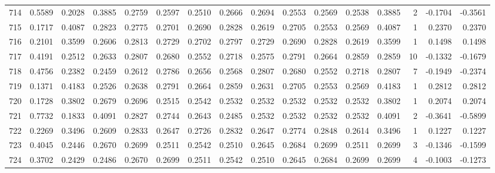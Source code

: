 \begin{tabular}{lrrrrrrrrrrrrrrr}
714 &      0.5589 &  0.2028 &  0.3885 &  0.2759 &  0.2597 &  0.2510 &  0.2666 &  0.2694 &  0.2553 &  0.2569 &   0.2538 &     0.3885 &      2 &                   -0.1704 &                    -0.3561 \\
715 &      0.1717 &  0.4087 &  0.2823 &  0.2775 &  0.2701 &  0.2690 &  0.2828 &  0.2619 &  0.2705 &  0.2553 &   0.2569 &     0.4087 &      1 &                    0.2370 &                     0.2370 \\
716 &      0.2101 &  0.3599 &  0.2606 &  0.2813 &  0.2729 &  0.2702 &  0.2797 &  0.2729 &  0.2690 &  0.2828 &   0.2619 &     0.3599 &      1 &                    0.1498 &                     0.1498 \\
717 &      0.4191 &  0.2512 &  0.2633 &  0.2807 &  0.2680 &  0.2552 &  0.2718 &  0.2575 &  0.2791 &  0.2664 &   0.2859 &     0.2859 &     10 &                   -0.1332 &                    -0.1679 \\
718 &      0.4756 &  0.2382 &  0.2459 &  0.2612 &  0.2786 &  0.2656 &  0.2568 &  0.2807 &  0.2680 &  0.2552 &   0.2718 &     0.2807 &      7 &                   -0.1949 &                    -0.2374 \\
719 &      0.1371 &  0.4183 &  0.2526 &  0.2638 &  0.2791 &  0.2664 &  0.2859 &  0.2631 &  0.2705 &  0.2553 &   0.2569 &     0.4183 &      1 &                    0.2812 &                     0.2812 \\
720 &      0.1728 &  0.3802 &  0.2679 &  0.2696 &  0.2515 &  0.2542 &  0.2532 &  0.2532 &  0.2532 &  0.2532 &   0.2532 &     0.3802 &      1 &                    0.2074 &                     0.2074 \\
721 &      0.7732 &  0.1833 &  0.4091 &  0.2827 &  0.2744 &  0.2643 &  0.2485 &  0.2532 &  0.2532 &  0.2532 &   0.2532 &     0.4091 &      2 &                   -0.3641 &                    -0.5899 \\
722 &      0.2269 &  0.3496 &  0.2609 &  0.2833 &  0.2647 &  0.2726 &  0.2832 &  0.2647 &  0.2774 &  0.2848 &   0.2614 &     0.3496 &      1 &                    0.1227 &                     0.1227 \\
723 &      0.4045 &  0.2446 &  0.2670 &  0.2699 &  0.2511 &  0.2542 &  0.2510 &  0.2645 &  0.2684 &  0.2699 &   0.2511 &     0.2699 &      3 &                   -0.1346 &                    -0.1599 \\
724 &      0.3702 &  0.2429 &  0.2486 &  0.2670 &  0.2699 &  0.2511 &  0.2542 &  0.2510 &  0.2645 &  0.2684 &   0.2699 &     0.2699 &      4 &                   -0.1003 &                    -0.1273 \\

\end{tabular}

